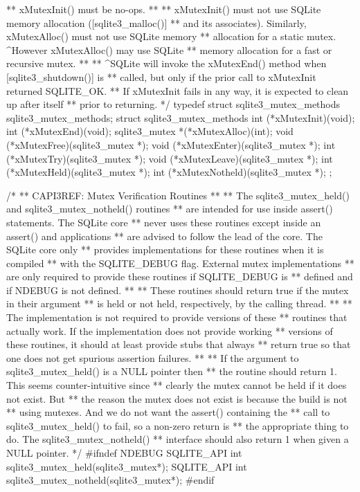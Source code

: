 \begin{Codex}[label=sqlite3.h,numbers=left]
{** xMutexInit() must be no-ops.
**
** xMutexInit() must not use SQLite memory allocation ([sqlite3_malloc()]
** and its associates).  Similarly, xMutexAlloc() must not use SQLite memory
** allocation for a static mutex.  ^However xMutexAlloc() may use SQLite
** memory allocation for a fast or recursive mutex.
**
** ^SQLite will invoke the xMutexEnd() method when [sqlite3_shutdown()] is
** called, but only if the prior call to xMutexInit returned SQLITE_OK.
** If xMutexInit fails in any way, it is expected to clean up after itself
** prior to returning.
*/
typedef struct sqlite3_mutex_methods sqlite3_mutex_methods;
struct sqlite3_mutex_methods {
  int (*xMutexInit)(void);
  int (*xMutexEnd)(void);
  sqlite3_mutex *(*xMutexAlloc)(int);
  void (*xMutexFree)(sqlite3_mutex *);
  void (*xMutexEnter)(sqlite3_mutex *);
  int (*xMutexTry)(sqlite3_mutex *);
  void (*xMutexLeave)(sqlite3_mutex *);
  int (*xMutexHeld)(sqlite3_mutex *);
  int (*xMutexNotheld)(sqlite3_mutex *);
};

/*
** CAPI3REF: Mutex Verification Routines
**
** The sqlite3_mutex_held() and sqlite3_mutex_notheld() routines
** are intended for use inside assert() statements.  The SQLite core
** never uses these routines except inside an assert() and applications
** are advised to follow the lead of the core.  The SQLite core only
** provides implementations for these routines when it is compiled
** with the SQLITE_DEBUG flag.  External mutex implementations
** are only required to provide these routines if SQLITE_DEBUG is
** defined and if NDEBUG is not defined.
**
** These routines should return true if the mutex in their argument
** is held or not held, respectively, by the calling thread.
**
** The implementation is not required to provide versions of these
** routines that actually work. If the implementation does not provide working
** versions of these routines, it should at least provide stubs that always
** return true so that one does not get spurious assertion failures.
**
** If the argument to sqlite3_mutex_held() is a NULL pointer then
** the routine should return 1.   This seems counter-intuitive since
** clearly the mutex cannot be held if it does not exist.  But
** the reason the mutex does not exist is because the build is not
** using mutexes.  And we do not want the assert() containing the
** call to sqlite3_mutex_held() to fail, so a non-zero return is
** the appropriate thing to do.  The sqlite3_mutex_notheld()
** interface should also return 1 when given a NULL pointer.
*/
#ifndef NDEBUG
SQLITE_API int sqlite3_mutex_held(sqlite3_mutex*);
SQLITE_API int sqlite3_mutex_notheld(sqlite3_mutex*);
#endif

}
\end{Codex}
